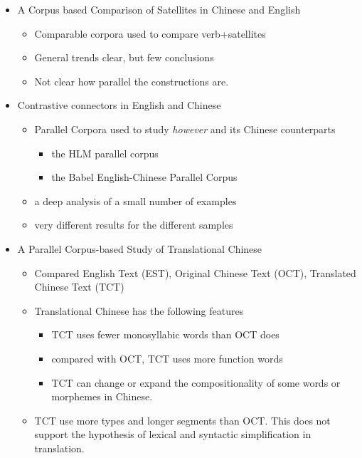 \documentclass[a4paper,landscape,headrule,footrule,xetex]{foils}
\begin{document}
\begin{itemize}
\item A Corpus based Comparison of Satellites in Chinese and English
  \begin{itemize}
  \item Comparable corpora used to compare verb+satellites
  \item General trends clear, but few conclusions
  \item Not clear how parallel the constructions are.
  \end{itemize}
\item Contrastive connectors in English and Chinese
  \begin{itemize}
  \item Parallel Corpora used to study  \textit{however} and its Chinese counterparts
    \begin{itemize}
    \item the HLM parallel corpus
    \item the Babel English-Chinese Parallel Corpus
    \end{itemize}
  \item a deep analysis of a small number of examples
  \item very different results for the different samples
  \end{itemize}
\newpage
\item A Parallel Corpus-based Study of Translational Chinese
\begin{itemize}
\item Compared English Text (EST), Original Chinese Text (OCT),
  Translated Chinese Text (TCT)
\item Translational Chinese has the following features
  \begin{itemize}
  \item TCT uses fewer monosyllabic words than OCT does
  \item compared with OCT, TCT uses more function words
  \item TCT can change or expand the compositionality of some words or morphemes in
    Chinese.
\end{itemize}
\item TCT use more types and longer segments than OCT. This does not
  support the hypothesis of lexical and syntactic simplification in translation.
\end{itemize}
\end{itemize}
\end{document}
